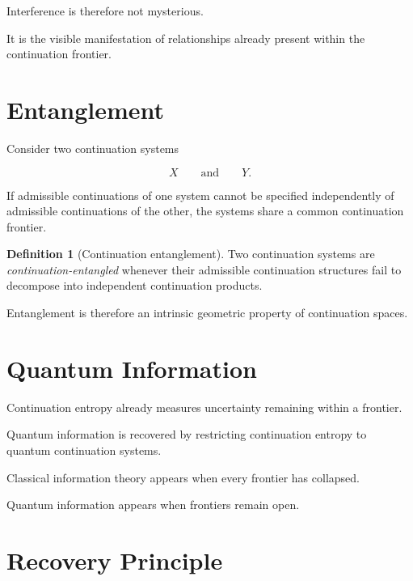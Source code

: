 \documentclass[13pt,openany]{book}
\theoremstyle{plain}
\theoremstyle{definition}
\newtheorem{definition}{Definition}[chapter]
\begin{document}
Interference is therefore not mysterious.

It is the visible manifestation of relationships already present within the
continuation frontier.

\section{Entanglement}

Consider two continuation systems

\[
X
\qquad\text{and}\qquad
Y.
\]

If admissible continuations of one system cannot be specified independently of
admissible continuations of the other, the systems share a common continuation
frontier.

\begin{definition}[Continuation entanglement]
Two continuation systems are \emph{continuation-entangled} whenever their
admissible continuation structures fail to decompose into independent
continuation products.
\end{definition}

Entanglement is therefore an intrinsic geometric property of continuation
spaces.

\section{Quantum Information}

Continuation entropy already measures uncertainty remaining within a frontier.

Quantum information is recovered by restricting continuation entropy to
quantum continuation systems.

Classical information theory appears when every frontier has collapsed.

Quantum information appears when frontiers remain open.

\section{Recovery Principle}
\end{document}
